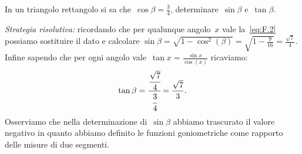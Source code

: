  \begin{esempio}
In un triangolo rettangolo si sa che~\(\cos \beta=\frac{3}{4}\), 
determinare~\(\sin \beta\) e~\(\tan \beta\).

\emph{Strategia risolutiva:}
ricordando che per qualunque angolo~\(x\) vale la~\ref{eq:F.2} possiamo 
sostituire 
il dato e calcolare
\(\sin \beta=\sqrt{1-\cos ^{2}(\beta 
)}=\sqrt{1-\frac{9}{16}}=\frac{\sqrt{7}}{4}\). 
Infine sapendo che per ogni angolo vale~\(\tan x=\frac{\sin x}{\cos (x)}\) 
ricaviamo:
\[\tan \beta=\cfrac{\cfrac{\sqrt{7}}{4}}{\cfrac{3}{4}}=\frac{\sqrt{7}}{3}.\]
Osserviamo che nella determinazione di~\(\sin \beta\) abbiamo trascurato il 
valore 
negativo in quanto abbiamo definito
le funzioni goniometriche come rapporto delle misure di due segmenti.
 \end{esempio}


